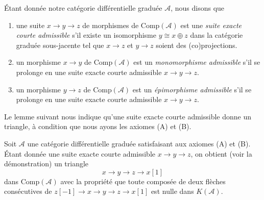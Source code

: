 \noindent
Étant donnée notre catégorie différentielle graduée $\mathcal{A}$, nous disons que
\begin{enumerate}
\item une suite $x \to y \to z$ de morphismes de $\text{Comp}(\mathcal{A})$ est
une {\it suite exacte courte admissible} s'il existe un isomorphisme $y \cong x
\oplus z$ dans la catégorie graduée sous-jacente tel que $x \to z$ et $y \to z$
soient des (co)projections.
\item un morphisme $x\to y$ de $\text{Comp}(\mathcal{A})$ est un {\it monomorphisme
admissible} s'il se prolonge en une suite exacte courte admissible $x\to y\to z$.
\item un morphisme $y\to z$ de $\text{Comp}(\mathcal{A})$ est un {\it épimorphisme
admissible} s'il se prolonge en une suite exacte courte admissible $x\to y\to z$.
\end{enumerate}
Le lemme suivant nous indique qu'une suite exacte courte admissible donne un
triangle, à condition que nous ayons les axiomes (A) et (B).

\begin{lemma}
\label{lemma-get-triangle}
Soit $\mathcal{A}$ une catégorie différentielle graduée satisfaisant aux axiomes
(A) et (B). Étant donnée une suite exacte courte admissible $x \to y \to z$, on
obtient (voir la démonstration) un triangle
$$
x \to y \to z \to x[1]
$$
dans $\text{Comp}(\mathcal{A})$ avec la propriété que toute composée de deux
flèches consécutives de $z[-1] \to x \to y \to z \to x[1]$ est nulle dans $K(\mathcal{A})$.
\end{lemma}

